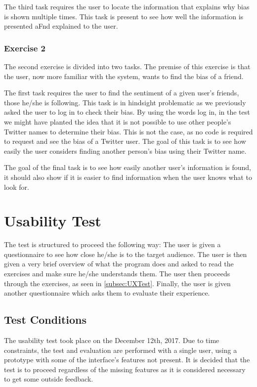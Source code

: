 The third task requires the user to locate the information that explains why
bias is shown multiple times. This task is present to see how well the information
is presented aFnd explained to the user.

\subsubsection{Exercise 2}
The second exercise is divided into two tasks. The premise of this exercise is
that the user, now more familiar with the system, wants to find the bias of a
friend.\nl

The first task requires the user to find the sentiment of a given user's
friends, those he/she is following. This task is in hindsight problematic as we
previously asked the user to log in to check their bias. By using the words log
in, in the test we might have planted the idea that it is not possible to use
other people's Twitter names to determine their bias. This is not the case, as
no code is required to request and see the bias of a Twitter user. The goal of this task
is to see how easily the user considers finding another person's bias using
their Twitter name.\nl

 The goal of the final task is to see how easily another user's information is
 found, it should also show if it is easier to find information when the user
 knows what to look for.


\section{Usability Test}\label{sec:UXUT}
The test is structured to proceed the following way: The user is given a
questionnaire to see how close he/she is to the target audience. The user is
then given a very brief overview of what the program does and asked to read the
exercises and make sure he/she understands them. The user then proceeds through
the exercises, as seen in \autoref{subsec:UXTest}. Finally, the user is given
another questionnaire which asks them to evaluate their experience.

\subsection{Test Conditions}
The usability test took place on the December 12th, 2017. Due to time
constraints, the test and evaluation are performed with a single user,
using a prototype with some of the interface's features not present. It is
decided that the test is to proceed regardless of the missing features as it is considered
necessary to get some outside feedback.\nl

